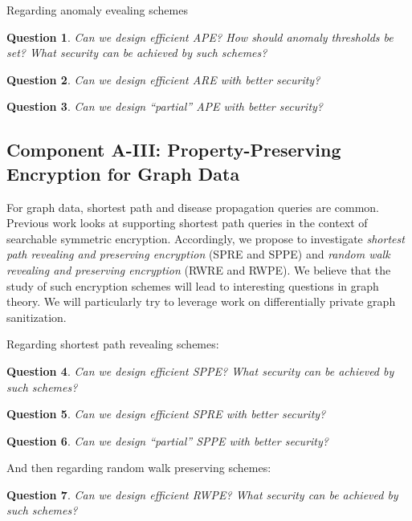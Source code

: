 \documentclass[11pt]{article}
\newtheorem{question}{Question}[section]
\theoremstyle{remark}
\begin{document}
Regarding anomaly  evealing schemes
\begin{question}
Can we design efficient APE?  How should anomaly thresholds be set?  What security can be achieved by such schemes?
\end{question}


\begin{question}
Can we design efficient ARE with better security?
\end{question}

\begin{question}
Can we design ``partial'' APE with better security?
\end{question}

\subsection{Component A-III:  Property-Preserving Encryption for Graph Data} 

For graph data, shortest path and disease propagation queries are common.  Previous work looks at supporting shortest path queries in the context of searchable symmetric encryption.  Accordingly, we propose to investigate \emph{shortest path revealing  and preserving encryption} (SPRE and SPPE) and \emph{random walk revealing and preserving encryption} (RWRE and RWPE).   We believe that the study of such encryption schemes will lead to interesting questions in graph theory.  We will particularly try to leverage work on differentially private graph sanitization. 

Regarding shortest path revealing schemes: 

\begin{question}
Can we design efficient SPPE?  What security can be achieved by such schemes?
\end{question}


\begin{question}
Can we design efficient SPRE with better security?
\end{question}

\begin{question}
Can we design ``partial'' SPPE with better security?
\end{question}

And then regarding random walk preserving schemes:

\begin{question}
Can we design efficient RWPE?  What security can be achieved by such schemes?
\end{question}
\end{document}
